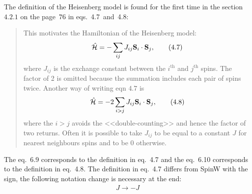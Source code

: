     The definition of the Heisenberg model is found for the first time in the section~$4.2.1$ on the page~$76$ in eqs.~4.7~and~4.8:
    \begin{quote}
        This motivates the Hamiltonian of the Heisenberg model:
        \begin{equation}
            \hat{\mathcal{H}} = -\sum_{ij}J_{ij}\mathbf{S}_i \cdot \mathbf{S}_j, \label{eq:micm-4.7} \tag{4.7}
        \end{equation}
        where $J_{ij}$ is the exchange constant between the $i^{\text{th}}$ and $j^{\text{th}}$ spins. 
        The factor of 2 is omitted because the summation includes each pair of spins twice. 
        Another way of writing eqn $4.7$ is 
        \begin{equation}
            \hat{\mathcal{H}} = -2\sum_{i>j}J_{ij}\mathbf{S}_i \cdot \mathbf{S}_j, \label{eq:micm-4.8} \tag{4.8}
        \end{equation}
        where the $i > j$ avoids the <<double-counting>> and hence the factor of two returns. 
        Often it is possible to take $J_{ij}$ to be equal to a constant $J$ for nearest neighbours spins and to be $0$ otherwise.
    \end{quote}
    The eq.~6.9 corresponds to the definition in eq.~4.7
    and the eq.~6.10 corresponds to the definition in eq.~4.8. 
    The definition in eq.~4.7 differs from SpinW with the sign, the following notation change is necessary at the end:
    \begin{equation}
        \begin{matrix} 
            J \rightarrow -J
        \end{matrix}
    \end{equation}

